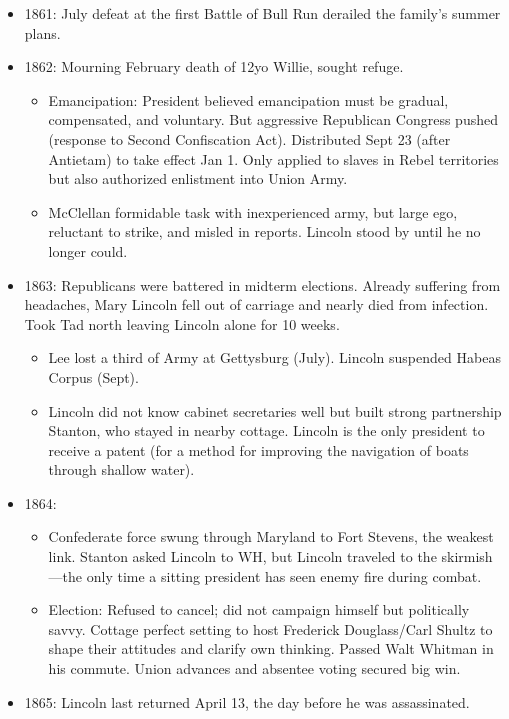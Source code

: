 \documentclass[
]{article}
\begin{document}
\begin{itemize}
\item
  1861: July defeat at the first Battle of Bull Run derailed the
  family's summer plans.
\item
  1862: Mourning February death of 12yo Willie, sought refuge.

  \begin{itemize}
  \item
    Emancipation: President believed emancipation must be gradual,
    compensated, and voluntary. But aggressive Republican Congress
    pushed (response to Second Confiscation Act). Distributed Sept 23
    (after Antietam) to take effect Jan 1. Only applied to slaves in
    Rebel territories but also authorized enlistment into Union Army.
  \item
    McClellan formidable task with inexperienced army, but large ego,
    reluctant to strike, and misled in reports. Lincoln stood by until
    he no longer could.
  \end{itemize}
\item
  1863: Republicans were battered in midterm elections. Already
  suffering from headaches, Mary Lincoln fell out of carriage and nearly
  died from infection. Took Tad north leaving Lincoln alone for 10
  weeks.

  \begin{itemize}
  \item
    Lee lost a third of Army at Gettysburg (July). Lincoln suspended
    Habeas Corpus (Sept).
  \item
    Lincoln did not know cabinet secretaries well but built strong
    partnership Stanton, who stayed in nearby cottage. Lincoln is the
    only president to receive a patent (for a method for improving the
    navigation of boats through shallow water).
  \end{itemize}
\item
  1864:

  \begin{itemize}
  \item
    Confederate force swung through Maryland to Fort Stevens, the
    weakest link. Stanton asked Lincoln to WH, but Lincoln traveled to
    the skirmish---the only time a sitting president has seen enemy fire
    during combat.
  \item
    Election: Refused to cancel; did not campaign himself but
    politically savvy. Cottage perfect setting to host Frederick
    Douglass/Carl Shultz to shape their attitudes and clarify own
    thinking. Passed Walt Whitman in his commute. Union advances and
    absentee voting secured big win.
  \end{itemize}
\item
  1865: Lincoln last returned April 13, the day before he was
  assassinated.
\end{itemize}
\end{document}
